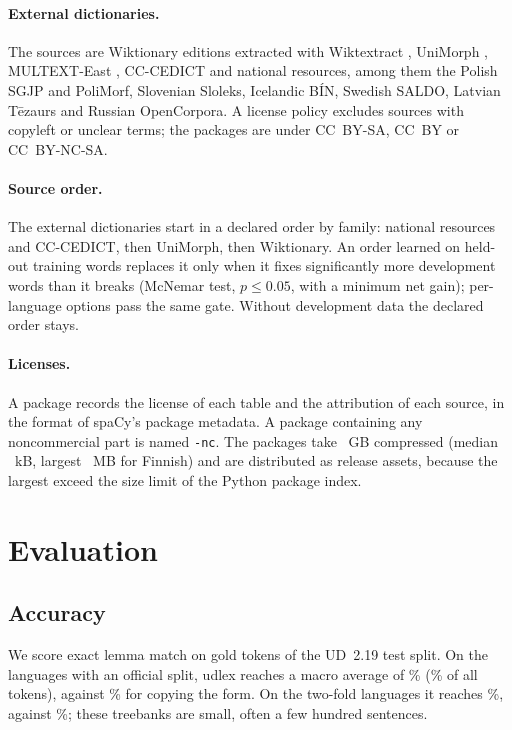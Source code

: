 \documentclass[11pt]{article}
\begin{document}
\paragraph{External dictionaries.} The \relSources{} sources are Wiktionary
editions extracted with Wiktextract \citep{ylonen-2022-wiktextract},
UniMorph \citep{kirov-etal-2018-unimorph}, MULTEXT-East
\citep{erjavec-2012-multext}, CC-CEDICT and \relNational{} national
resources, among them the Polish SGJP and PoliMorf, Slovenian Sloleks,
Icelandic B\'IN, Swedish SALDO, Latvian T\=ezaurs and Russian OpenCorpora.
A license policy excludes sources with copyleft or unclear terms; the
packages are under CC~BY-SA, CC~BY or CC~BY-NC-SA.

\paragraph{Source order.} The external dictionaries start in a declared order
by family: national resources and CC-CEDICT, then UniMorph, then Wiktionary. An order
learned on held-out training words replaces it only when it fixes
significantly more development words than it breaks (McNemar test,
$p \le 0.05$, with a minimum net gain); per-language options pass the same
gate. Without development data the declared order stays.

\paragraph{Licenses.} A package records the license of each table and the
attribution of each source, in the format of spaCy's package metadata. A
package containing any noncommercial part is named \texttt{-nc}. The
\relLangs{} packages take \relArchiveGB{}~GB compressed (median
\relArchiveMedianKB{}~kB, largest \relArchiveMaxMB{}~MB for Finnish) and are
distributed as release assets, because the largest exceed the size limit of
the Python package index.

\section{Evaluation}
\label{sec:evaluation}

\subsection{Accuracy}

We score exact lemma match on gold tokens of the UD~2.19 test split. On the
\accOffN{} languages with an official split, udlex reaches a macro average of
\accOffMacro\% (\accOffPooled\% of all \accOffTokens{} tokens), against
\accOffCopy\% for copying the form. On the \accTwoN{} two-fold languages it
reaches \accTwoMacro\%, against \accTwoCopy\%; these treebanks are small,
often a few hundred sentences.
\end{document}
